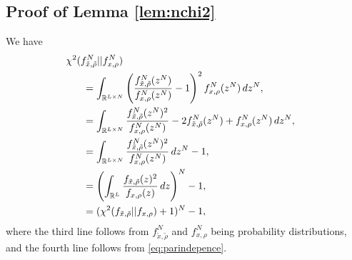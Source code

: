 \documentclass{IEEEtran}
\numberwithin{equation}{section}
\numberwithin{figure}{section}
\theoremstyle{plain}
\theoremstyle{definition}
\theoremstyle{remark}
\theoremstyle{plain}
\theoremstyle{remark}
\theoremstyle{plain}
\theoremstyle{plain}
\theoremstyle{remark}
\newcommand{\reals}{\mathbb{R}}
\begin{document}



\appendix


\subsection{Proof of Lemma \ref{lem:nchi2}}
\label{proof:eqnchi2}

We have 
\begin{align*}
\chi^2(f^N_{\tilde x,\tilde \rho}||f^N_{x,\rho}) \hspace{-40pt}\\
&=\int_{\reals^{L\times N}} \left(\frac{f^N_{\tilde x,\tilde \rho}(z^N)}{f^N_{x,\rho}(z^N)}-1\right)^2 f^N_{x,\rho}(z^N)\, dz^N,\\
&=\int_{\reals^{L\times N}} \frac{f^N_{\tilde x,\tilde \rho}(z^N)^2}{f^N_{x,\rho}(z^N)}-2 f^N_{\tilde x,\tilde \rho}(z^N)+f^N_{x,\rho}(z^N)\,dz^N,\\
&=\int_{\reals^{L\times N}} \frac{f^N_{\tilde x,\tilde \rho}(z^N)^2}{f^N_{x,\rho}(z^N)}\,dz^N -1,\\
&=\left(\int_{\reals^{L}} \frac{f_{\tilde x,\tilde \rho}(z)^2}{f_{x,\rho}(z)}\,dz\right)^N -1,\\
&=(\chi^2(f_{\tilde x,\tilde \rho}||f_{x,\rho})+1)^N-1,\\
\end{align*}
where the third line follows from $f^N_{\tilde x,\tilde \rho}$ and $f^N_{x,\rho}$ being probability distributions, and the fourth line follows from \eqref{eq:parindepence}.
\end{document}
